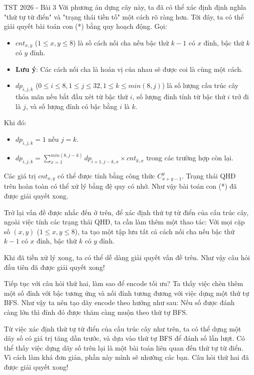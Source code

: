 \begin{tutorial}{TST 2026 - Bài 3}
Với phương án dựng cây này, ta đã có thể xác định định nghĩa "thứ tự từ điển" và "trạng thái tiền tố" một cách rõ ràng hơn. Tới đây, ta có thể giải quyết bài toán con (*) bằng quy hoạch động. Gọi:
\begin{itemize}
   \item $cnt_{x,y}$ ($1\le x,y\le 8$) là số cách nối cha nếu bậc thứ $k-1$ có $x$ đỉnh, bậc thứ $k$ có $y$ đỉnh.
   \item \textbf{Lưu ý}: Các cách nối cha là hoán vị của nhau sẽ được coi là cùng một cách.
   \item $dp_{i,j,k}$ ($0\le i\le 8,1\le j\le 32,1\le k\le min(8,j)$) là số lượng cấu trúc cây thỏa mãn nếu bắt đầu xét từ bậc thứ $i$, số lượng đỉnh tính từ bậc thứ $i$ trở đi là $j$, và số lượng đỉnh có bậc bằng $i$ là $k$.
\end{itemize}

Khi đó:
\begin{itemize}
   \item $dp_{i,j,k}=1$ nếu $j=k$.
   \item $dp_{i,j,k}=\sum_{x=1}^{min(8,j-k)} dp_{i+1,j-k,x}\times cnt_{k,x}$ trong các trường hợp còn lại.
\end{itemize}

Các giá trị $cnt_{x,y}$ có thể được tính bằng công thức $C^y_{x+y-1}$. Trạng thái QHĐ trên hoàn toàn có thể xử lý bằng đệ quy có nhớ. Như vậy bài toán con (*) đã được giải quyết xong.

Trở lại vấn đề được nhắc đến ở trên, để xác định thứ tự từ điển của cấu trúc cây, ngoài việc tính các trạng thái QHĐ, ta cần làm thêm một thao tác: Với mọi cặp số $(x,y)$ ($1\le x,y\le 8$), ta tạo một tập lưu tất cả cách nối cha nếu bậc thứ $k-1$ có $x$ đỉnh, bậc thứ $k$ có $y$ đỉnh.

Khi đã tiền xử lý xong, ta có thể dễ dàng giải quyết vấn đề trên. Như vậy câu hỏi đầu tiên đã được giải quyết xong!

Tiếp tục với câu hỏi thứ hai, làm sao để encode tối ưu? Ta thấy việc chèn thêm một số đỉnh với bậc tương ứng và nối đỉnh tương đương với việc dựng một thứ tự BFS. Như vậy ta nên tạo dãy encode theo hướng như sau: Nếu số được đánh càng lớn thì đỉnh đó được thăm càng muộn theo thứ tự BFS.

Từ việc xác định thứ tự từ điển của cấu trúc cây như trên, ta có thể dựng một dãy số có giá trị tăng dần trước, và dựa vào thứ tự BFS để đánh số lần lượt. Có thể thấy việc dựng dãy số trên lại là một bài toán liên quan đến thứ tự từ điển. Vì cách làm khá đơn giản, phần này mình sẽ nhường các bạn. Câu hỏi thứ hai đã được giải quyết xong!


\end{tutorial}
